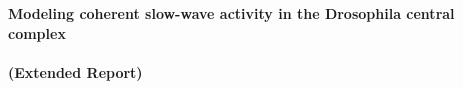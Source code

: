 \documentclass[../extended_report.tex]{subfiles}
\begin{document}
    \thispagestyle{empty}
    \begin{center}
        \vspace*{7cm}
            
        \textbf{\huge Modeling coherent slow-wave activity in the Drosophila central complex \\\phantom{}}\\[1 cm]

        \textbf{\huge (Extended Report)}
    \end{center}
\end{document}
